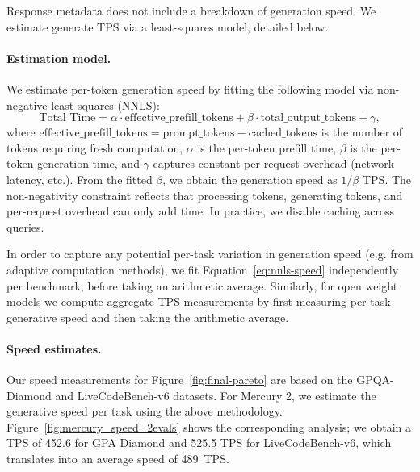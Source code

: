 \documentclass[11pt, a4paper, logo, copyright, gdm]{google}
\begin{document}
Response metadata does not include a breakdown of generation speed. We estimate generate TPS via a least-squares model, detailed below.

\paragraph{Estimation model.}
We estimate per-token generation speed by fitting the following model
via non-negative least-squares (NNLS):
\begin{equation}
    \text{Total Time} = \alpha \cdot \text{effective\_prefill\_tokens}
    + \beta \cdot \text{total\_output\_tokens} + \gamma,
    \label{eq:nnls-speed}
\end{equation}
where $\text{effective\_prefill\_tokens} = \text{prompt\_tokens} - \text{cached\_tokens}$ is the number of tokens requiring fresh computation, $\alpha$ is the per-token prefill time, $\beta$ is the per-token generation time, and $\gamma$ captures constant per-request overhead (network latency, etc.). From the fitted $\beta$, we obtain the generation speed as $1/\beta$ TPS. The non-negativity constraint reflects that processing tokens, generating tokens, and per-request overhead can only add time. In practice, we disable caching across queries.

In order to capture any potential per-task variation in generation speed (e.g. from adaptive computation methods), we fit Equation~\eqref{eq:nnls-speed} independently per benchmark, before taking an arithmetic average. Similarly, for open weight models we compute aggregate TPS measurements by first measuring per-task generative speed and then taking the arithmetic average.  

\paragraph{Speed estimates.}

Our speed measurements for Figure~\ref{fig:final-pareto} are based on the GPQA-Diamond and LiveCodeBench-v6 datasets. For Mercury 2, we estimate the generative speed per task using the above methodology. Figure~\ref{fig:mercury_speed_2evals} shows the corresponding analysis; we obtain a TPS of 452.6 for GPA Diamond and 525.5 TPS for LiveCodeBench-v6, which translates into an average speed of 489~TPS.
\end{document}

